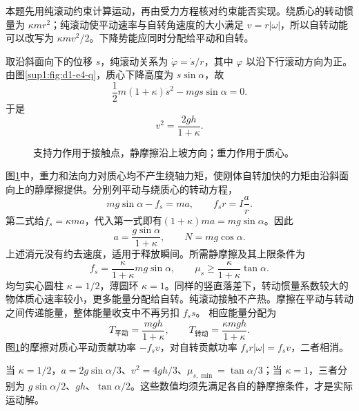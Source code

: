 \begin{solution}
本题先用纯滚动约束计算运动，再由受力方程核对约束能否实现。绕质心的转动惯量为 $\kappa mr^2$；纯滚动使平动速率与自转角速度的大小满足 $v=r|\omega|$，所以自转动能可以改写为 $\kappa mv^2/2$。下降势能应同时分配给平动和自转。

取沿斜面向下的位移 $s$，纯滚动关系为 $\dot\varphi=\dot s/r$，其中 $\varphi$ 以沿下行滚动方向为正。由图\ref{sup1:fig:d1-e4-q}，质心下降高度为 $s\sin\alpha$，故
\[
\frac12m(1+\kappa)\dot s^2-mgs\sin\alpha=0.
\]
于是
\[
\boxed{v^2=\frac{2gh}{1+\kappa}}.
\]

\begin{figure}[H]\centering
{}
\caption{支持力作用于接触点，静摩擦沿上坡方向；重力作用于质心。}\label{sup1:fig:d1-e4-s}
\end{figure}

图\ref{sup1:fig:d1-e4-s}中，重力和法向力对质心均不产生绕轴力矩，使刚体自转加快的力矩由沿斜面向上的静摩擦提供。分别列平动与绕质心的转动方程，
\[
mg\sin\alpha-f_s=ma,\qquad f_s r=I\frac a r.
\]
第二式给$f_s=\kappa ma$，代入第一式即有$(1+\kappa)ma=mg\sin\alpha$。因此
\[
\boxed{a=\frac{g\sin\alpha}{1+\kappa}},\qquad
N=mg\cos\alpha.
\]
上述消元没有约去速度，适用于释放瞬间。所需静摩擦及其上限条件为
\[
f_s=\frac{\kappa}{1+\kappa}mg\sin\alpha,
\qquad
\boxed{\mu_s\ge\frac{\kappa}{1+\kappa}\tan\alpha}.
\]
均匀实心圆柱 $\kappa=1/2$，薄圆环 $\kappa=1$。同样的竖直落差下，转动惯量系数较大的物体质心速率较小，更多能量分配给自转。纯滚动接触不产热。摩擦在平动与转动之间传递能量，整体能量收支中不再另扣 $f_s s$。
相应能量分配为
\[
T_{\text{平动}}=\frac{mgh}{1+\kappa},\qquad
T_{\text{转动}}=\frac{\kappa mgh}{1+\kappa}.
\]
图\ref{sup1:fig:d1-e4-s}的摩擦对质心平动贡献功率 $-f_s v$，对自转贡献功率 $f_s r|\omega|=f_s v$，二者相消。

当 $\kappa=1/2$，$a=2g\sin\alpha/3$、$v^2=4gh/3$、$\mu_{s,\min}=\tan\alpha/3$；当 $\kappa=1$，三者分别为 $g\sin\alpha/2$、$gh$、$\tan\alpha/2$。这些数值均须先满足各自的静摩擦条件，才是实际运动解。

\end{solution}




